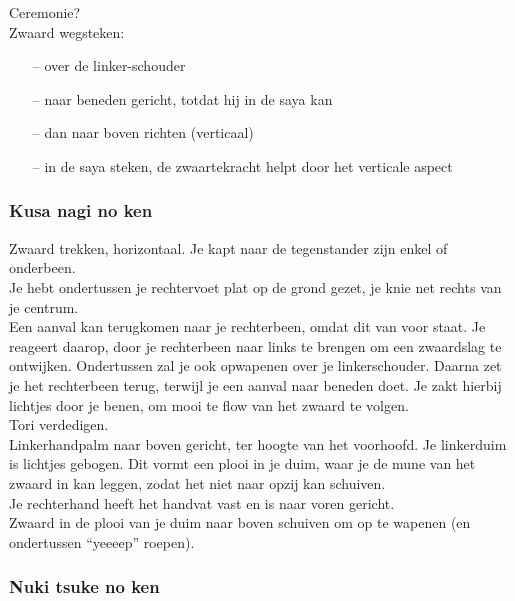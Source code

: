 Ceremonie?\\

Zwaard wegsteken:
\begin{itemize}
\item[--] over de linker-schouder
\item[--] naar beneden gericht, totdat hij in de saya kan
\item[--] dan naar boven richten (verticaal)
\item[--] in de saya steken, de zwaartekracht helpt door het verticale aspect
\end{itemize}


\subsubsection{Kusa nagi no ken}

\suwaristart
Zwaard trekken, horizontaal. Je kapt naar de tegenstander zijn enkel of onderbeen.\\
Je hebt ondertussen je rechtervoet plat op de grond gezet, je knie net rechts van je centrum.\\
Een aanval kan terugkomen naar je rechterbeen, omdat dit van voor staat. Je reageert daarop, door je rechterbeen naar links te brengen om een zwaardslag te ontwijken. Ondertussen zal je ook opwapenen over je linkerschouder. Daarna zet je het rechterbeen terug, terwijl je een aanval naar beneden doet. Je zakt hierbij lichtjes door je benen, om mooi te flow van het zwaard te volgen.\\
Tori verdedigen.\\
Linkerhandpalm naar boven gericht, ter hoogte van het voorhoofd. Je linkerduim is lichtjes gebogen. Dit vormt een plooi in je duim, waar je de mune van het zwaard in kan leggen, zodat het niet naar opzij kan schuiven.\\
Je rechterhand heeft het handvat vast en is naar voren gericht.\\
Zwaard in de plooi van je duim naar boven schuiven om op te wapenen (en ondertussen ``yeeeep'' roepen).\\
\suwaristop

\subsubsection{Nuki tsuke no ken}

